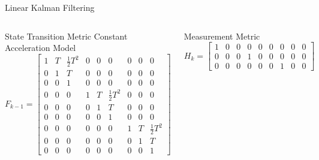 \documentclass[10pt]{beamer}
\begin{document}
\begin{frame}{Linear Kalman Filtering}
\begin{columns}
        \begin{block}{State Transition Metric}
        Constant Acceleration Model
        \tiny
              $$F_{k-1} =
                 \left[\begin{array}{ccccccccc}
                      1 & T & \frac{1}{2} T^2 & 0 & 0 & 0 & 0 & 0 & 0\\
                      0 & 1 & T & 0 & 0 & 0 & 0 & 0 & 0 \\
                      0 & 0 & 1 & 0 & 0 & 0 & 0 & 0 & 0\\
                      0 & 0 & 0 &  1 & T & \frac{1}{2} T^2 & 0 & 0 & 0\\
                      0 & 0 & 0 & 0 & 1 & T & 0 & 0 & 0\\
                      0 & 0 & 0 & 0 & 0 & 1 & 0 & 0 & 0\\
                      0 & 0 & 0 & 0 & 0 & 0 & 1 & T & \frac{1}{2} T^2\\
                      0 & 0 & 0 & 0 & 0 & 0 & 0 & 1 & T\\
                      0 & 0 & 0 & 0 & 0 & 0 & 0 & 0 & 1
                      \end{array}\right]$$
        \end{block}
        \begin{block}{Measurement Metric}
              $$ H_{k} =
                    \left[\begin{array}{ccccccccc}
                          1 & 0 & 0 & 0 & 0 & 0 & 0 & 0 & 0 \\
                          0 & 0 & 0 & 1 & 0 & 0 & 0 & 0 & 0 \\
                          0 & 0 & 0 & 0 & 0 & 0 & 1 & 0 & 0
                          \end{array}\right]$$
        \end{block}          
   \end{columns}
\end{frame}
\end{document}
